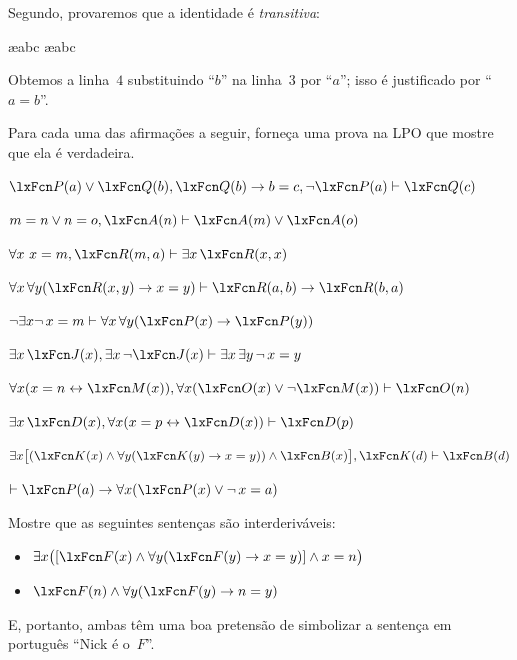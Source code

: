 Segundo, provaremos que a identidade é \emph{transitiva}:
\begin{fitchproof}
	\open
		\AS
		\ae{abc}
		\ae{abc}
	\close
\end{fitchproof}
Obtemos a linha~$4$ substituindo \textquotedblleft $b$\textquotedblright{} na linha~$3$ por \textquotedblleft $a$\textquotedblright{}; isso é justificado por \textquotedblleft $a=b$\textquotedblright{}.

\practiceproblems
\problempart
\label{pr.identity}
Para cada uma das afirmações a seguir, forneça uma prova na LPO que mostre
que ela é verdadeira.
\begin{compactlist}
\item $\atom{P}{a} \eor \atom{Q}{b}, \atom{Q}{b} \eif b=c, \enot\atom{P}{a} \proves \atom{Q}{c}$
\item $m=n \eor n=o, \atom{A}{n} \proves \atom{A}{m} \eor \atom{A}{o}$
\item $\forall x\ x=m, \atom{R}{m,a} \proves \exists x\,\atom{R}{x,x}$
\item $\forall x\,\forall y(\atom{R}{x,y} \eif x=y)\proves \atom{R}{a,b} \eif \atom{R}{b,a}$
\item $\enot \exists x\enot\, {x = m} \proves \forall x\,\forall y (\atom{P}{x} \eif \atom{P}{y})$
\item $\exists x\,\atom{J}{x}, \exists x\, \enot\atom{J}{x}\proves \exists x\, \exists y\, \enot\, {x = y}$
\item $\forall x(x=n \eiff \atom{M}{x}), \forall x(\atom{O}{x} \eor \enot \atom{M}{x})\proves \atom{O}{n}$
\item $\exists x\,\atom{D}{x}, \forall x(x=p \eiff \atom{D}{x})\proves \atom{D}{p}$
\item $\exists x\bigl[(\atom{K}{x} \eand \forall y(\atom{K}{y} \eif x=y)) \eand \atom{B}{x}\bigr], \atom{K}{d} \proves \atom{B}{d}$
\item $\proves \atom{P}{a} \eif \forall x(\atom{P}{x} \eor \enot\, {x = a})$
\end{compactlist}

\problempart
Mostre que as seguintes sentenças são interderiváveis:
\begin{itemize}
\item $\exists x \bigl([\atom{F}{x} \eand \forall y (\atom{F}{y} \eif x = y)] \eand x = n\bigr)$
\item $\atom{F}{n} \eand \forall y (\atom{F}{y} \eif n= y)$
\end{itemize}
E, portanto, ambas têm uma boa pretensão de simbolizar a sentença em português \textquotedblleft Nick é o~$F$\textquotedblright{}.

